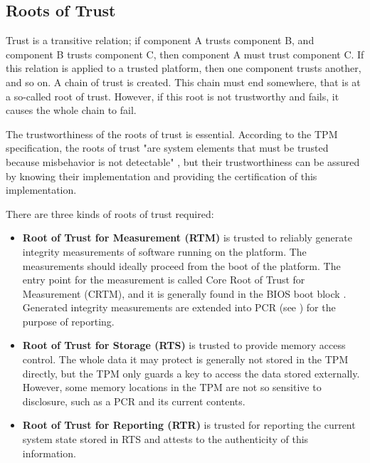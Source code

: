 \subsection{Roots of Trust}
Trust is a transitive relation; if component A trusts component B, and component B trusts component C, then component A must trust component C. If this relation is applied to a trusted platform, then one component trusts another, and so on. A chain of trust is created. This chain must end somewhere, that is at a so-called root of trust. However, if this root is not trustworthy and fails, it causes the whole chain to fail.

The trustworthiness of the roots of trust is essential. According to the TPM specification, the roots of trust "are system elements that must be trusted because misbehavior is not detectable" \cite[p.~23]{tcg_p1_architecture}, but their trustworthiness can be assured by knowing their implementation and providing the certification of this implementation.




There are three kinds of roots of trust required:
\begin{itemize}
    \item \textbf{Root of Trust for Measurement (RTM)} is trusted to reliably generate integrity measurements of software running on the platform. The measurements should ideally proceed from the boot of the platform. The entry point for the measurement is called Core Root of Trust for Measurement (CRTM), and it is generally found in the BIOS boot block \cite[p.~185]{Tomlinson2017}. Generated integrity measurements are extended into PCR (see ) for the purpose of reporting.
    \item \textbf{Root of Trust for Storage (RTS)} is trusted to provide memory access control. The whole data it may protect is generally not stored in the TPM directly, but the TPM only guards a key to access the data stored externally. However, some memory locations in the TPM are not so sensitive to disclosure, such as a PCR and its current contents. 
    \item \textbf{Root of Trust for Reporting (RTR)} is trusted for reporting the current system state stored in RTS and attests to the authenticity of this information.
\end{itemize}

